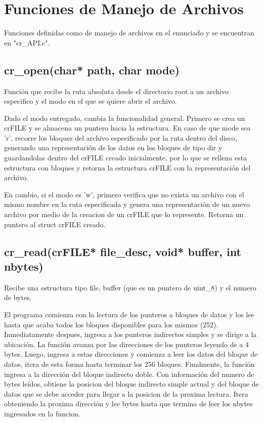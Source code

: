 \documentclass[12pt]{article}
\begin{document}
\section{Funciones de Manejo de Archivos}
Funciones definidas como de manejo de archivos en el enunciado y se encuentran en "cr\_API.c".

\subsection{cr\_open(char* path, char mode)}
Función que recibe la ruta absoluta desde el directorio root a un archivo  especifico y el modo en el que se quiere abrir el archivo.

Dado el modo entregado, cambia la funcionalidad general. Primero se crea un crFILE y se almacena un puntero hacia la estructura. En caso de que mode sea 'r', recorre los bloques del archivo especificado por la ruta dentro del disco, generando una representación de los datos en los bloques de tipo dir y guardandolas dentro del crFILE creado inicialmente, por lo que se rellena esta estructura con bloques y retorna la estructura crFILE con la representación del archivo.

En cambio, si el modo es 'w', primero verifica que no exista un archivo con el mismo nombre en la ruta especificada y genera una representación de un nuevo archivo por medio de la creacion de un crFILE que lo represente. Retorna un puntero al struct crFILE creado.

\subsection{cr\_read(crFILE* file\_desc, void* buffer, int nbytes)}
Recibe una estructura tipo file, buffer (que es un puntero de uint_8) y el numero de bytes. 

El programa comienza con la lectura de los punteros a bloques de datos y los lee hasta que acaba todos los bloques disponibles para los mismos (252). Inmediatamente despues, ingresa a los punteros indirectos simples y se dirige a la ubicación. La función avanza por las direcciones de los punteros leyendo de a 4 bytes. Luego, ingresa a estas direcciones y comienza a leer los datos del bloque de datos, itera de esta forma hasta terminar los 256 bloques. Finalmente, la función ingresa a la dirección del bloque indirecto doble. Con información del numero de bytes leídos, obtiene la posicion del bloque indirecto simple actual y del bloque de datos que se debe acceder para llegar a la posicion de la proxima lectura. Itera obteniendo la proxima dirección y lee bytes hasta que termina de leer los nbytes ingresados en la funcion.
\end{document}
